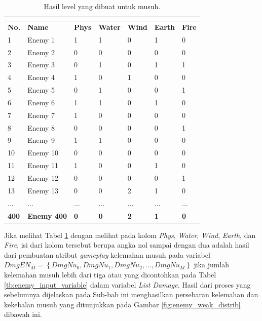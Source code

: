 \begin{longtable}{|l|l|l|l|l|l|l|}
	\caption{Hasil level yang dibuat untuk musuh.}
	\vspace{1ex}
	\label{tb:enemy_weak_distrib}\\
	\hline
	\rowcolor[HTML]{C0C0C0} 
	\textbf{No.} & \textbf{Name} & \textbf{Phys} & \textbf{Water} & \textbf{Wind} & \textbf{Earth} & \textbf{Fire} \\ \hline
	1 & Enemy 1 & 1 & 1 & 0 & 1 & 0 \\ \hline
	2 & Enemy 2 & 0 & 0 & 0 & 0 & 0 \\ \hline
	3 & Enemy 3 & 0 & 1 & 0 & 1 & 1 \\ \hline
	4 & Enemy 4 & 1 & 0 & 1 & 0 & 0 \\ \hline
	5 & Enemy 5 & 0 & 1 & 0 & 0 & 1 \\ \hline
	6 & Enemy 6 & 1 & 1 & 0 & 1 & 0 \\ \hline
	7 & Enemy 7 & 1 & 0 & 0 & 0 & 0 \\ \hline
	8 & Enemy 8 & 0 & 0 & 0 & 0 & 1 \\ \hline
	9 & Enemy 9 & 1 & 1 & 0 & 0 & 0 \\ \hline
	10 & Enemy 10 & 0 & 0 & 0 & 0 & 0 \\ \hline
	11 & Enemy 11 & 1 & 0 & 0 & 1 & 0 \\ \hline
	12 & Enemy 12 & 0 & 0 & 0 & 0 & 1 \\ \hline
	13 & Enemy 13 & 0 & 0 & 2 & 1 & 0 \\ \hline
	... & ... & ... & ... & ... & ... & ... \\ \hline
	\textbf{400} & \textbf{Enemy 400} & \textbf{0} & \textbf{0} & \textbf{2} & \textbf{1} & \textbf{0} \\ \hline
\end{longtable}
\vspace{1ex}

Jika melihat Tabel \ref{tb:enemy_weak_distrib} dengan melihat pada kolom \textit{Phys}, \textit{Water}, \textit{Wind}, \textit{Earth}, dan \textit{Fire}, isi dari kolom tersebut berupa angka nol sampai dengan dua adalah hasil dari pembuatan atribut \textit{gameplay} kelemahan musuh pada variabel $DmgEN_{M} = \left \{ DmgNu_{0}, DmgNu_{1}, DmgNu_{2}, ..., DmgNu_{M} \right \}$ jika jumlah kelemahan musuh lebih dari tiga atau yang dicontohkan pada Tabel \ref{tb:enemy_input_variable} dalam variabel \textit{List Damage}. Hasil dari proses yang sebelumnya dijelaskan pada Sub-bab ini menghasilkan persebaran kelemahan dan kekebalan musuh yang ditunjukkan pada Gambar \ref{fig:enemy_weak_distrib} dibawah ini.

